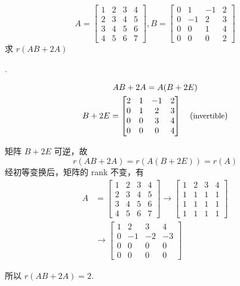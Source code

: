 \begin{example}
    \[
        A = \begin{bmatrix}
            1 & 2 & 3 & 4 \\
            2 & 3 & 4 & 5 \\
            3 & 4 & 5 & 6 \\
            4 & 5 & 6 & 7 
        \end{bmatrix}, 
        B = \begin{bmatrix}
            0 & 1  & -1 &  2 \\
            0 & -1 &  2 &  3 \\
            0 & 0  & 1  & 4 \\
            0 & 0  & 0  & 2
        \end{bmatrix}
    \]
    求 $r(AB + 2A)$

    \cite[question 314]{w660}.

    \begin{gather*}
        AB + 2A = A(B + 2E) \\ 
        B + 2E = \begin{bmatrix}
            2 & 1 & -1 & 2 \\ 
            0 & 1 & 2  & 3 \\
            0 & 0 & 3  & 4 \\
            0 & 0 & 0  & 4 
        \end{bmatrix} \quad (\mbox{\small invertible})
    \end{gather*}

    矩阵 $B + 2E$ 可逆，故
    \[
        r(AB + 2A) = r(A(B + 2E)) = r(A)
    \]
    经初等变换后，矩阵的 rank 不变，有
    \begin{align*}
        A &= \begin{bmatrix}
            1 & 2 & 3 & 4 \\
            2 & 3 & 4 & 5 \\
            3 & 4 & 5 & 6 \\
            4 & 5 & 6 & 7 
        \end{bmatrix}
        \rightarrow 
        \begin{bmatrix}
            1 & 2 & 3 & 4 \\
            1 & 1 & 1 & 1 \\
            1 & 1 & 1 & 1 \\
            1 & 1 & 1 & 1 
        \end{bmatrix} \\
          &\rightarrow 
        \begin{bmatrix}
            1 & 2  & 3  & 4 \\
            0 & -1 & -2 & -3 \\
            0 & 0  & 0  & 0 \\
            0 & 0  & 0  & 0
        \end{bmatrix}
    \end{align*}

    所以 $r(AB + 2A) = 2$.
\end{example}

